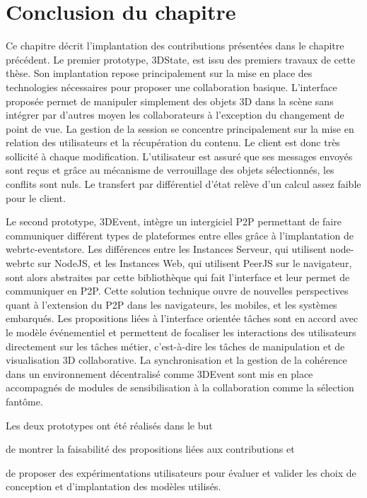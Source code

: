\section{Conclusion du chapitre}

Ce chapitre décrit l'implantation des contributions présentées dans le chapitre 
précédent.
Le premier prototype, 3DState, est issu des premiers travaux de cette thèse. Son 
implantation repose principalement sur la mise en place des technologies 
nécessaires pour proposer une collaboration basique. L'interface proposée permet 
de  manipuler simplement des objets 3D dans la scène sans intégrer par d'autres 
moyen les collaborateurs à l'exception du changement de point de vue. La gestion 
de la session se concentre principalement sur la mise en relation des utilisateurs 
et la récupération du contenu. Le client est donc très sollicité à chaque 
modification. L'utilisateur est assuré que ses messages envoyés sont reçus et 
grâce au mécanisme de verrouillage des objets sélectionnés, les conflits sont 
nuls. 
Le transfert par différentiel d'état relève d'un calcul assez faible pour le client.

Le second prototype, 3DEvent, intègre un intergiciel \gls{P2P} permettant de faire 
communiquer différent types de plateformes entre elles grâce à l'implantation de 
webrtc-eventstore. Les différences entre les Instances Serveur, qui utilisent  
node-webrtc sur NodeJS, et les Instances Web, qui utilisent PeerJS sur le 
navigateur, sont alors abstraites par cette bibliothèque qui fait l'interface et leur 
permet de communiquer en \gls{P2P}. Cette solution technique ouvre de nouvelles 
perspectives quant à l'extension du \gls{P2P} dans les navigateurs, les mobiles, 
et les systèmes embarqués. Les propositions liées à l'interface orientée tâches 
sont en accord avec le modèle événementiel et permettent de focaliser les 
interactions des utilisateurs directement sur les tâches métier, c'est-à-dire les 
tâches de manipulation et de visualisation 3D collaborative. La synchronisation et 
la gestion de la cohérence dans un environnement décentralisé comme 3DEvent 
sont mis en place accompagnés de modules de sensibilisation à la collaboration 
comme la sélection fantôme.

Les deux prototypes ont été réalisés dans le but 
\begin{enumerate*}[label=(\roman*)]
	\item de montrer la faisabilité des 
	propositions liées aux contributions et
	\item de proposer des expérimentations 
	utilisateurs pour évaluer et valider les choix de conception et d'implantation des 
	modèles utilisés.
\end{enumerate*}
